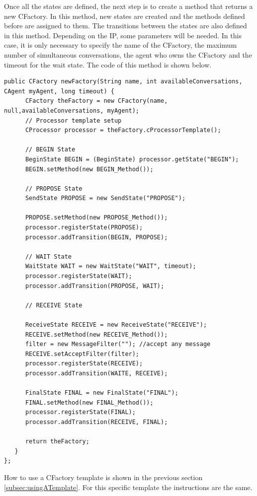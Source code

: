 Once all the states are defined, the next step is to create a method that returns a new CFactory. In this method, new states are created and the methods defined before are assigned to them. The transitions between the states are also defined in this method. Depending on the IP,  some parameters will be needed. In this case, it is only necessary to specify the name of the CFactory, the maximum number of simultaneous conversations, the agent who owns the CFactory and the timeout for the wait state. The code of this method is shown below.
\begin{lstlisting}[style=Java]
   public CFactory newFactory(String name, int availableConversations, CAgent myAgent, long timeout) {
      CFactory theFactory = new CFactory(name, null,availableConversations, myAgent);
      // Processor template setup
      CProcessor processor = theFactory.cProcessorTemplate();

      // BEGIN State
      BeginState BEGIN = (BeginState) processor.getState("BEGIN");
      BEGIN.setMethod(new BEGIN_Method());

      // PROPOSE State
      SendState PROPOSE = new SendState("PROPOSE");

      PROPOSE.setMethod(new PROPOSE_Method());
      processor.registerState(PROPOSE);
      processor.addTransition(BEGIN, PROPOSE);

      // WAIT State
      WaitState WAIT = new WaitState("WAIT", timeout);
      processor.registerState(WAIT);
      processor.addTransition(PROPOSE, WAIT);

      // RECEIVE State

      ReceiveState RECEIVE = new ReceiveState("RECEIVE");
      RECEIVE.setMethod(new RECEIVE_Method());
      filter = new MessageFilter(""); //accept any message
      RECEIVE.setAcceptFilter(filter);
      processor.registerState(RECEIVE);
      processor.addTransition(WAITE, RECEIVE);

      FinalState FINAL = new FinalState("FINAL");
      FINAL.setMethod(new FINAL_Method());
      processor.registerState(FINAL);
      processor.addTransition(RECEIVE, FINAL);

      return theFactory;
   }
};
\end{lstlisting}
How to use a CFactory template is shown in the previous section \ref{subsec:usingATemplate}. For this specific template the instructions are the same.
